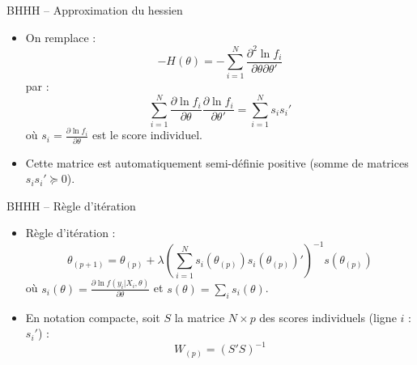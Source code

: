 \documentclass[11pt,aspectratio=169]{beamer}
\begin{document}
\begin{frame}{BHHH -- Approximation du hessien}

\begin{itemize}

\item On remplace :
  \[
  -H(\theta) = -\sum_{i=1}^{N}\frac{\partial^2 \ln f_i}{\partial \theta \partial \theta'}
  \]
  par :
  \[
  \sum_{i=1}^{N}\frac{\partial \ln f_i}{\partial \theta}\frac{\partial \ln f_i}{\partial \theta'} = \sum_{i=1}^{N} s_i s_i'
  \]
  où $s_i = \frac{\partial \ln f_i}{\partial \theta}$ est le score individuel.\newline

\item Cette matrice est automatiquement semi-définie positive (somme de matrices $s_i s_i' \succeq 0$).

\end{itemize}

\end{frame}

\begin{frame}{BHHH -- Règle d'itération}

\begin{itemize}

\item Règle d'itération :
  \[
  \boxed{\theta_{(p+1)} = \theta_{(p)} + \lambda \left(\sum_{i=1}^{N} s_i(\theta_{(p)}) s_i(\theta_{(p)})'\right)^{-1} s(\theta_{(p)})}
  \]
  où $s_i(\theta) = \frac{\partial \ln f(y_i | X_i, \theta)}{\partial \theta}$ et $s(\theta) = \sum_i s_i(\theta)$.\newline

\item En notation compacte, soit $S$ la matrice $N \times p$ des scores individuels (ligne $i$ : $s_i'$) :
  \[
  W_{(p)} = (S'S)^{-1}
  \]

\end{itemize}

\end{frame}
\end{document}
